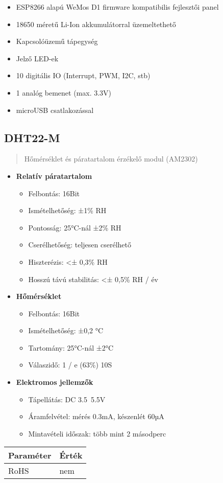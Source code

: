 \begin{itemize}
    \item ESP8266 alapú WeMos D1 firmware kompatibilis fejlesztői panel
    \item 18650 méretű Li-Ion akkumulátorral üzemeltethető
    \item Kapcsolóüzemű tápegység
    \item Jelző LED-ek
    \item 10 digitális IO (Interrupt, PWM, I2C, stb)
    \item 1 analóg bemenet (max. 3.3V)
    \item microUSB csatlakozással
\end{itemize}

\clearpage
\subsection{DHT22-M}
\begin{quote}
    Hőmérséklet és páratartalom érzékelő modul (AM2302)
\end{quote}
\begin{itemize}
    \item \textbf{Relatív páratartalom}
    \begin{itemize}
        \item Felbontás: 16Bit
        \item Ismételhetőség: ±1\% RH
        \item Pontosság: 25°C-nál ±2\% RH
        \item Cserélhetőség: teljesen cserélhető
        \item Hiszterézis: <± 0,3\% RH
        \item Hosszú távú stabilitás: <± 0,5\% RH / év
    \end{itemize}
    \item \textbf{Hőmérséklet}
    \begin{itemize}
        \item Felbontás: 16Bit
        \item Ismételhetőség: ±0,2 °C
        \item Tartomány: 25°C-nál ±2°C
        \item Válaszidő: 1 / e (63\%) 10S
    \end{itemize}
    \item \textbf{Elektromos jellemzők}
    \begin{itemize}
        \item Tápellátás: DC 3.5~5.5V
        \item Áramfelvétel: mérés 0.3mA, készenlét 60µA
        \item Mintavételi időszak: több mint 2 másodperc
    \end{itemize}
\end{itemize}
{
    \small
    \noindent
    \begin{tabularx}{\textwidth}{@{}lX@{}}
    \toprule
    \textbf{Paraméter} & \textbf{Érték} \\
    \midrule
    RoHS & nem \\
    \bottomrule
    \end{tabularx}
}

